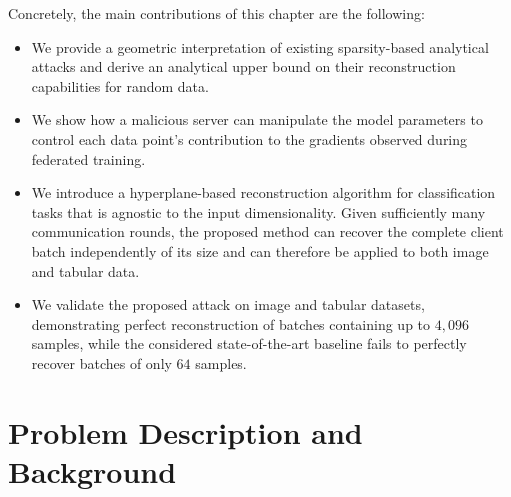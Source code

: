 Concretely, the main contributions of this chapter are the following:
\begin{itemize}
    \item We provide a geometric interpretation of existing sparsity-based analytical attacks and derive an analytical upper bound on their reconstruction capabilities for random data.

    \item We show how a malicious server can manipulate the model parameters to control each data point's contribution to the gradients observed during federated training.

    \item We introduce a hyperplane-based reconstruction algorithm for classification tasks that is agnostic to the input dimensionality. Given sufficiently many communication rounds, the proposed method can recover the complete client batch independently of its size and can therefore be applied to both image and tabular data. 

    \item We validate the proposed attack on image and tabular datasets, demonstrating perfect reconstruction of batches containing up to $4{,}096$ samples, while the considered state-of-the-art baseline fails to perfectly recover batches of only $64$ samples. 
\end{itemize}

\section{Problem Description and Background}\label{sec:ctp_background}


